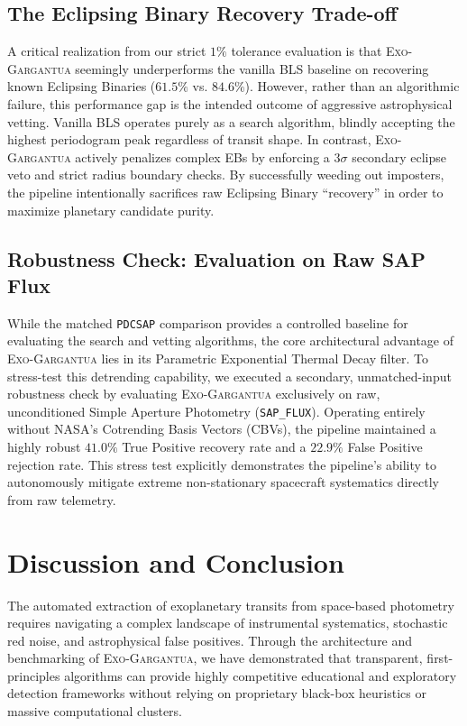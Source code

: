 \documentclass[twocolumn,linenumbers]{aastex701}
\begin{document}
\subsection{The Eclipsing Binary Recovery Trade-off}
A critical realization from our strict $1\%$ tolerance evaluation is that \textsc{Exo-Gargantua} seemingly underperforms the vanilla BLS baseline on recovering known Eclipsing Binaries ($61.5\%$ vs. $84.6\%$). However, rather than an algorithmic failure, this performance gap is the intended outcome of aggressive astrophysical vetting. Vanilla BLS operates purely as a search algorithm, blindly accepting the highest periodogram peak regardless of transit shape. In contrast, \textsc{Exo-Gargantua} actively penalizes complex EBs by enforcing a $3\sigma$ secondary eclipse veto and strict radius boundary checks. By successfully weeding out imposters, the pipeline intentionally sacrifices raw Eclipsing Binary ``recovery'' in order to maximize planetary candidate purity.

\subsection{Robustness Check: Evaluation on Raw SAP Flux}
While the matched \texttt{PDCSAP} comparison provides a controlled baseline for evaluating the search and vetting algorithms, the core architectural advantage of \textsc{Exo-Gargantua} lies in its Parametric Exponential Thermal Decay filter. To stress-test this detrending capability, we executed a secondary, unmatched-input robustness check by evaluating \textsc{Exo-Gargantua} exclusively on raw, unconditioned Simple Aperture Photometry (\texttt{SAP\_FLUX}). Operating entirely without NASA's Cotrending Basis Vectors (CBVs), the pipeline maintained a highly robust $41.0\%$ True Positive recovery rate and a $22.9\%$ False Positive rejection rate. This stress test explicitly demonstrates the pipeline's ability to autonomously mitigate extreme non-stationary spacecraft systematics directly from raw telemetry.

\section{Discussion and Conclusion} \label{sec:discussion}

The automated extraction of exoplanetary transits from space-based photometry requires navigating a complex landscape of instrumental systematics, stochastic red noise, and astrophysical false positives. Through the architecture and benchmarking of \textsc{Exo-Gargantua}, we have demonstrated that transparent, first-principles algorithms can provide highly competitive educational and exploratory detection frameworks without relying on proprietary black-box heuristics or massive computational clusters.
\end{document}
